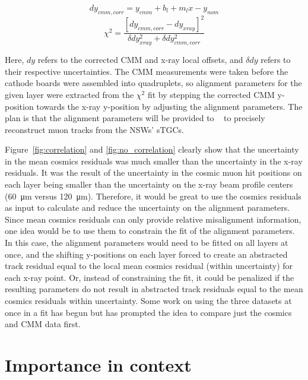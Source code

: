 \begin{equation}
    dy_{cmm, corr} = y_{cmm} + b_l + m_{l}x - y_{nom}
    \label{eqn:dy_cmm_corr}
\end{equation}
\begin{equation}
    \chi^2 = \frac{\left[dy_{cmm, corr} - dy_{xray}\right]^2}{\delta dy_{xray}^2 + \delta dy_{cmm, corr}^2}
    \label{eqn:chi2}  
\end{equation}

Here, $dy$ refers to the corrected CMM and x-ray local offsets, and $\delta dy$ refers to their respective uncertainties. The CMM measurements were taken before the cathode boards were assembled into quadruplets, so alignment parameters for the given layer were extracted from the $\chi^2$ fit by stepping the corrected CMM y-position towards the x-ray y-position by adjusting the alignment parameters. The plan is that the alignment parameters will be provided to ~\cite{the_atlas_collaboration_athena} to precisely reconstruct muon tracks from the NSWs' sTGCs.

Figure~\ref{fig:correlation} and \ref{fig:no_correlation} clearly show that the uncertainty in the mean cosmics residuals was much smaller than the uncertainty in the x-ray residuals. It was the result of the uncertainty in the cosmic muon hit positions on each layer being smaller than the uncertainty on the x-ray beam profile centers (\SI{60}{\micro\meter} versus \SI{120}{\micro\meter}). Therefore, it would be great to use the cosmics residuals as input to calculate and reduce the uncertainty on the alignment parameters. Since mean cosmics residuals can only provide relative misalignment information, one idea would be to use them to constrain the fit of the alignment parameters. In this case, the alignment parameters would need to be fitted on all layers at once, and the shifting y-positions on each layer forced to create an abstracted track residual equal to the local mean cosmics residual (within uncertainty) for each x-ray point. Or, instead of constraining the fit, it could be penalized if the resulting parameters do not result in abstracted track residuals equal to the mean cosmics residuals within uncertainty. Some work on using the three datasets at once in a fit has begun but has prompted the idea to compare just the cosmics and CMM data first.

\section{Importance in context}
\label{sec:importance}


